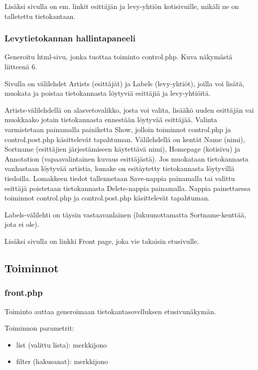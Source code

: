 \documentclass[a4paper,12pt]{report}
\begin{document}
Lisäksi sivulla on em. linkit esittäjän ja levy-yhtiön kotisivuille, mikäli
ne on talletettu tietokantaan.

\subsubsection{Levytietokannan hallintapaneeli}

Generoitu html-sivu, jonka tuottaa toiminto control.php. Kuva näkymästä
liitteenä 6.

Sivulla on välilehdet Artists (esittäjät) ja Labels (levy-yhtiöt), joilla
voi lisätä, muokata ja poistaa tietokannasta löytyviä esittäjiä ja
levy-yhtiöitä.

Artists-välilehdellä on alasvetovalikko, josta voi valita, lisääkö uuden
esittäjän vai muokkaako jotain tietokannasta ennestään löytyvää esittäjää.
Valinta varmistetaan painamalla painiketta Show, jolloin toiminnot
control.php ja control.post.php käsittelevät tapahtuman.  Välilehdellä on
kentät Name (nimi), Sortname (esittäjien järjestämiseen käytettävä nimi),
Homepage (kotisivu) ja Annotation (vapaavalintainen kuvaus esittäjästä). Jos
muokataan tietokannasta vanhastaan löytyvää artistia, lomake on esitäytetty
tietokannasta löytyvillä tiedoilla.  Lomakkeen tiedot tallennetaan
Save-nappia painamalla tai valittu esittäjä poistetaan tietokannasta
Delete-nappia painamalla.  Nappia painettaessa toiminnot control.php ja
control.post.php käsittelevät tapahtuman.

Labels-välilehti on täysin vastaavanlainen (lukuunottamatta
Sortname-kenttää, jota ei ole).

Lisäksi sivulla on linkki Front page, joka vie takaisin etusivulle.

\subsection{Toiminnot}

\subsubsection{front.php}

Toiminto auttaa generoimaan tietokantasovelluksen etusivunäkymän.

Toiminnon parametrit:
\begin{itemize}
  \item list (valittu lista): merkkijono
  \item filter (hakusanat): merkkijono
\end{itemize}
\end{document}
